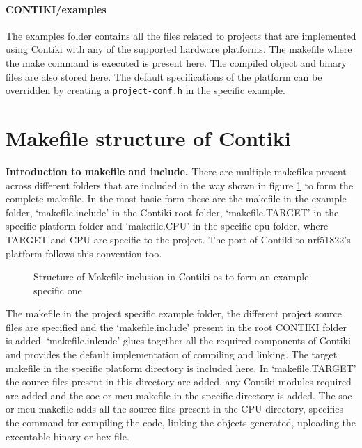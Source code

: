 \paragraph{CONTIKI/examples} The examples folder contains all the files related to projects that are implemented using Contiki with any of the supported hardware platforms. The makefile where the make command is executed is present here. The compiled object and binary files are also stored here. The default specifications of the platform can be overridden by creating a \texttt{project-conf.h} in the specific example.


\section{Makefile structure of Contiki} \label{ApdxMakefile}

\textbf{Introduction to makefile and include.}
There are multiple makefiles present across different folders that are included in the way shown in figure \ref{MakefileLevel} to form the complete makefile. In the most basic form these are the makefile in the example folder, `makefile.include' in the Contiki root folder, `makefile.TARGET' in the specific platform folder and `makefile.CPU' in the specific cpu folder, where TARGET and CPU are specific to the project. The port of Contiki to nrf51822's platform follows this convention too.

\begin{figure}[h]
\centering
\def\svgwidth{0.93\columnwidth}

\vspace{-10pt}
\caption{Structure of Makefile inclusion in Contiki \gls{os} to form an example specific one}
\label{MakefileLevel}
\end{figure}


The makefile in the project specific example folder, the different project source files are specified and the `makefile.include' present in the root CONTIKI folder is added. `makefile.inlcude' glues together all the required components of Contiki and provides the default implementation of compiling and linking. The target makefile in the specific platform directory is included here. In `makefile.TARGET' the source files present in this directory are added, any Contiki modules required are added and the \gls{soc} or \gls{mcu} makefile in the specific directory is added. The \gls{soc} or \gls{mcu} makefile adds all the source files present in the CPU directory, specifies the command for compiling the code, linking the objects generated, uploading the executable binary or hex file.

